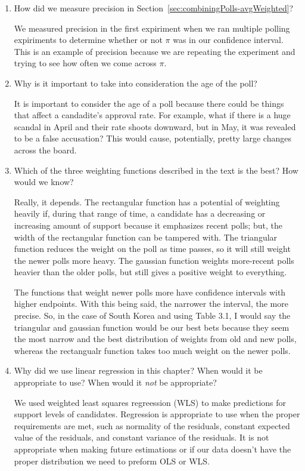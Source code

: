 \begin{enumerate}
 \item How did we measure precision in Section~\ref{sec:combiningPolls-avgWeighted}?
\begin{solution}
We measured precision in the first expiriment when we ran multiple polling expiriments to determine whether or not $\pi$ was in our confidence interval. This is an example of precision because we are repeating the experiment and trying to see how often we come across $\pi$. 
\end{solution}

 \item Why is it important to take into consideration the age of the poll?
\begin{solution}
It is important to consider the age of a poll because there could be things that affect a candadite's approval rate. For example, what if there is a huge scandal in April and their rate shoots downward, but in May, it was revealed to be a false accusation? This would cause, potentially, pretty large changes across the board. 
\end{solution}

 \item Which of the three weighting functions described in the text is the best? How would we know?
\begin{solution}
Really, it depends. The rectangular function has a potential of weighting heavily if, during that range of time, a candidate has a decreasing or increasing amount of support because it emphasizes recent polls; but, the width of the rectangular function can be tampered with. The triangular function reduces the weight on the poll as time passes, so it will still weight the newer polls more heavy. The gaussian function weights more-recent polls heavier than the older polls, but still gives a positive weight to everything. 

The functions that weight newer polls more have confidence intervals with higher endpoints. With this being said, the narrower the interval, the more precise. So, in the case of South Korea and using Table 3.1, I would say the triangular and gaussian function would be our best bets because they seem the most narrow and the best distribution of weights from old and new polls, whereas the rectangualr function takes too much weight on the newer polls. 
\end{solution}

 \item Why did we use linear regression in this chapter? When would it be appropriate to use? When would it \emph{not} be appropriate?
\begin{solution}
We used weighted least squares regreession (WLS) to make predictions for support levels of candidates. Regression is appropriate to use when the proper requirements are met, such as normality of the residuals, constant expected value of the residuals, and constant variance of the residuals. It is not appropriate when making future estimations or if our data doesn't have the proper distribution we need to preform OLS or WLS. 
\end{solution}

\end{enumerate}
